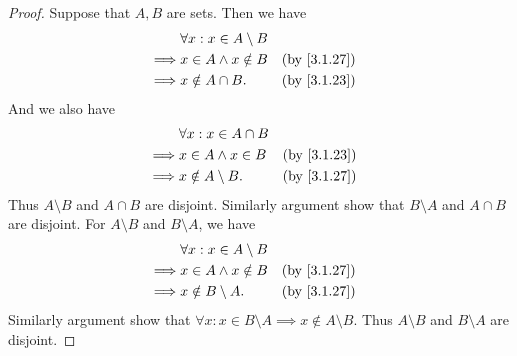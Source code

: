 \begin{proof}
  Suppose that \(A, B\) are sets.
  Then we have
  \begin{align*}
             & \forall x : x \in A \setminus B                  \\
    \implies & x \in A \land x \notin B        &  & \by{3.1.27} \\
    \implies & x \notin A \cap B.              &  & \by{3.1.23}
  \end{align*}
  And we also have
  \begin{align*}
             & \forall x : x \in A \cap B                  \\
    \implies & x \in A \land x \in B      &  & \by{3.1.23} \\
    \implies & x \notin A \setminus B.    &  & \by{3.1.27}
  \end{align*}
  Thus \(A \setminus B\) and \(A \cap B\) are disjoint.
  Similarly argument show that \(B \setminus A\) and \(A \cap B\) are disjoint.
  For \(A \setminus B\) and \(B \setminus A\), we have
  \begin{align*}
             & \forall x : x \in A \setminus B                  \\
    \implies & x \in A \land x \notin B        &  & \by{3.1.27} \\
    \implies & x \notin B \setminus A.         &  & \by{3.1.27}
  \end{align*}
  Similarly argument show that \(\forall x : x \in B \setminus A \implies x \notin A \setminus B\).
  Thus \(A \setminus B\) and \(B \setminus A\) are disjoint.


\end{proof}

